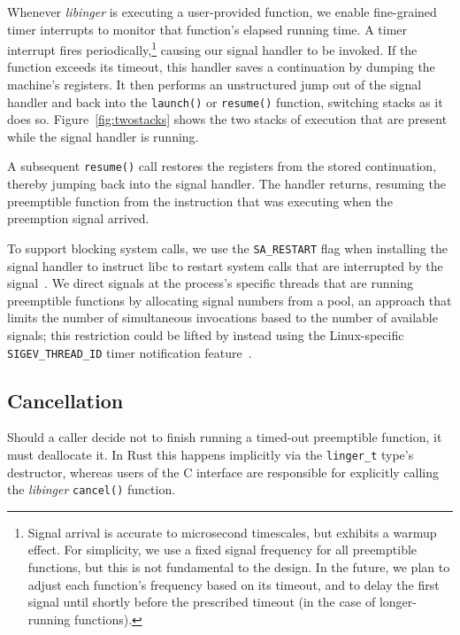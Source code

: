Whenever \textit{libinger} is executing a user-provided function, we
enable fine-grained timer interrupts to
monitor that function's elapsed running time.  A timer interrupt fires
periodically,\footnote{Signal arrival is accurate to microsecond timescales, but
exhibits a warmup effect.  For simplicity, we use a fixed signal frequency for all
preemptible functions, but this is not fundamental to the design.  In the future,
we plan to adjust each function's frequency based on its timeout, and to delay the
first signal until shortly before the prescribed timeout (in the case of
longer-running functions).} causing our signal
handler to be invoked.  If the function exceeds its timeout,
this handler saves a continuation by dumping the machine's registers.  It then
performs an unstructured jump out of the signal handler and back into the
\texttt{launch()} or \texttt{resume()} function, switching stacks as it does so.
Figure~\ref{fig:twostacks} shows the two stacks of execution
that are present while the
signal handler is running.

A subsequent \texttt{resume()} call restores the registers from the stored
continuation, thereby jumping back into the signal handler.  The handler
returns, resuming the preemptible function from the instruction that was executing
when the preemption signal arrived.

To support blocking system calls, we use the \texttt{SA\_RESTART} flag when
installing the signal handler to instruct libc to restart system calls that are
interrupted by the signal~\cite{sigaction-manpage}.  We direct signals at the
process's specific threads that are running preemptible functions by allocating
signal numbers from a pool, an approach that limits the number of simultaneous
invocations based to the number of available signals; this restriction could be
lifted by instead using the Linux-specific \texttt{SIGEV\_THREAD\_ID} timer
notification feature~\cite{timercreate-manpage}.





\subsection{Cancellation}

Should a caller decide not to finish running a timed-out preemptible function, it
must deallocate it.  In Rust this happens implicitly via the \texttt{linger\_t}
type's destructor, whereas users of the C interface are responsible for explicitly
calling the \textit{libinger} \texttt{cancel()} function.

